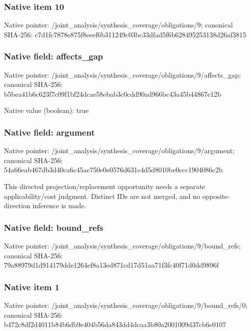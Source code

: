 \documentclass[10pt,a4paper]{article}
\begin{document}
\subsubsection{Native item 10}
Native pointer: /joint\_\allowbreak{}analysis/synthesis\_\allowbreak{}coverage/obligations/9; canonical SHA-256: c7d1fc7878e875f8eeef6b311249c03bc33dfad5f6b628495253138d26af3815

\subsubsection{Native field: affects\_\allowbreak{}gap}
Native pointer: /joint\_\allowbreak{}analysis/synthesis\_\allowbreak{}coverage/obligations/9/affects\_\allowbreak{}gap; canonical SHA-256: b5bea41b6c623f7c09f1bf24dcae58ebab3c0cdd90ad966bc43a45b44867e12b

Native value (boolean): true

\subsubsection{Native field: argument}
Native pointer: /joint\_\allowbreak{}analysis/synthesis\_\allowbreak{}coverage/obligations/9/argument; canonical SHA-256: 54a66eab467db3d40ca6c45ae750e0e0576d631e4d5d8010be0ccc1904086c2b

\begingroup\raggedright\sloppy This directed projection/\allowbreak{}replacement opportunity needs a separate applicability/\allowbreak{}cost judgment. Distinct IDs are not merged,\allowbreak{} and no opposite-direction inference is made.\par\endgroup

\subsubsection{Native field: bound\_\allowbreak{}refs}
Native pointer: /joint\_\allowbreak{}analysis/synthesis\_\allowbreak{}coverage/obligations/9/bound\_\allowbreak{}refs; canonical SHA-256: 79a88979d1d914179dde1264ef8a13ed871cd17d51aa71f3fc40f71d0dd9896f

\subsubsection{Native item 1}
Native pointer: /joint\_\allowbreak{}analysis/synthesis\_\allowbreak{}coverage/obligations/9/bound\_\allowbreak{}refs/0; canonical SHA-256: b472c8df2d4011b84b6db9e404b56da843dd4dcaa3b80a2001009d37cb6c0107
\end{document}
